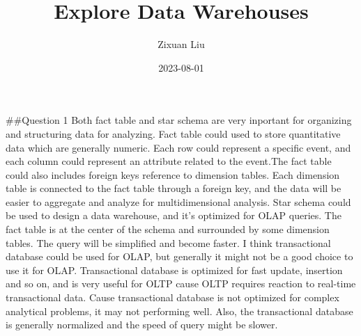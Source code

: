\documentclass[
]{article}
\title{Explore Data Warehouses}
\author{Zixuan Liu}
\date{2023-08-01}
\begin{document}
\maketitle

\#\#Question 1 Both fact table and star schema are very inportant for
organizing and structuring data for analyzing. Fact table could used to
store quantitative data which are generally numeric. Each row could
represent a specific event, and each column could represent an attribute
related to the event.The fact table could also includes foreign keys
reference to dimension tables. Each dimension table is connected to the
fact table through a foreign key, and the data will be easier to
aggregate and analyze for multidimensional analysis. Star schema could
be used to design a data warehouse, and it's optimized for OLAP queries.
The fact table is at the center of the schema and surrounded by some
dimension tables. The query will be simplified and become faster. I
think transactional database could be used for OLAP, but generally it
might not be a good choice to use it for OLAP. Transactional database is
optimized for fast update, insertion and so on, and is very useful for
OLTP cause OLTP requires reaction to real-time transactional data. Cause
transactional database is not optimized for complex analytical problems,
it may not performing well. Also, the transactional database is
generally normalized and the speed of query might be slower.
\end{document}
